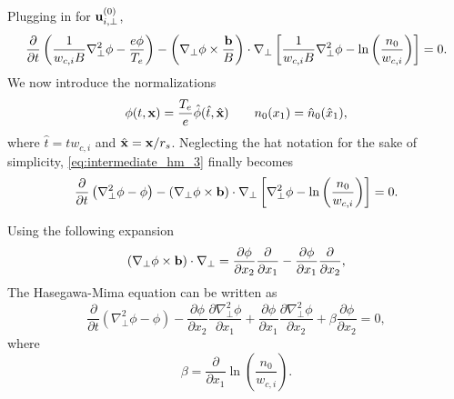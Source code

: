 \documentclass[oneside,a4paper,11pt]{report}
\begin{document}
Plugging in for $\mathbf{u}_{i,\perp}^{(0)}$,
\begin{equation}
\label{eq:intermediate_hm_3}
   \frac{\partial}{\partial t}\left ( \frac{1}{w_{c,i} B}\nabla_\perp^2 \phi - \frac{e \phi}{T_e} \right ) - \left( \nabla_\perp \phi \times \frac{\mathbf{b}}{B} \right) \cdot \nabla_\perp \left [ \frac{1}{w_{c,i} B} \nabla_\perp^2 \phi - \ln \left ( \frac{n_0}{w_{c,i}} \right) \right ] = 0.
\end{equation}
We now introduce the normalizations
\begin{equation}
    \phi(t,\mathbf{x}) = \frac{T_e}{e} \hat{\phi}(\hat{t},\hat{\mathbf{x}}) \qquad n_0(x_1) = \hat{n}_0(\hat{x}_1),
\end{equation}
where $\hat{t} = t w_{c,i}$ and $\hat{\mathbf{x}} = \mathbf{x} / r_s$. Neglecting the hat notation for the sake of simplicity, \cref{eq:intermediate_hm_3} finally becomes
\begin{equation}
    \label{eq:hasegawa_mima}
   \frac{\partial}{\partial t}\left ( \nabla_\perp^2 \phi - \phi \right ) - \left( \nabla_\perp \phi \times \mathbf{b} \right) \cdot \nabla_\perp \left [ \nabla_\perp^2 \phi - \ln \left( \frac{n_0}{w_{c,i}} \right) \right ] = 0.
\end{equation}

Using the following expansion
\begin{equation}
    \left ( \nabla_\perp \phi \times \mathbf{b} \right ) \cdot \nabla_\perp = \frac{\partial \phi}{\partial x_2} \frac{\partial}{\partial x_1} - \frac{\partial \phi}{\partial x_1} \frac{\partial}{\partial x_2},
\end{equation}
The Hasegawa-Mima equation can be written as
\begin{equation}
   \frac{\partial}{\partial t}\left ( \nabla_\perp^2 \phi - \phi \right ) - \frac{\partial \phi}{\partial x_2} \frac{\partial \nabla_\perp^2 \phi}{\partial x_1} + \frac{\partial \phi}{\partial x_1} \frac{\partial \nabla_\perp^2 \phi}{\partial x_2} + \beta \frac{\partial \phi}{\partial x_2} = 0,
\end{equation}
where 
\begin{equation}
    \beta = \frac{\partial}{\partial x_1} \ln \left ( \frac{n_0}{w_{c,i}} \right ).
\end{equation}

\end{document}
